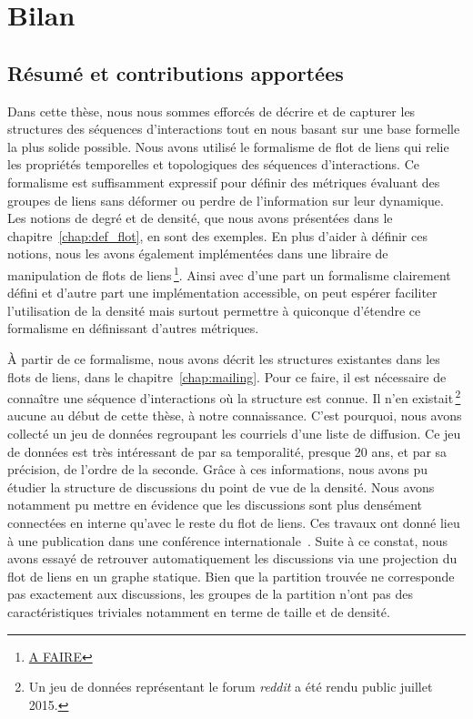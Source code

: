 \chapter*{Bilan}
\label{Conclusion}

\section{Résumé et contributions apportées}

Dans cette thèse, nous nous sommes efforcés de décrire et de capturer les structures des séquences d'interactions tout en nous basant sur une base formelle la plus solide possible.
Nous avons utilisé le formalisme de flot de liens qui relie les propriétés temporelles et topologiques des séquences d'interactions.
Ce formalisme est suffisamment expressif pour définir des métriques évaluant des groupes de liens sans déformer ou perdre de l'information sur leur dynamique.
Les notions de degré et de densité, que nous avons présentées dans le chapitre~\ref{chap:def_flot}, en sont des exemples.
En plus d'aider à définir ces notions, nous les avons également implémentées dans une libraire de manipulation de flots de liens\,\footnote{\url{A FAIRE}}.
Ainsi avec d'une part un formalisme clairement défini et d'autre part une implémentation accessible, on peut espérer faciliter l'utilisation de la densité mais surtout permettre à quiconque d'étendre ce formalisme en définissant d'autres métriques.

\`A partir de ce formalisme, nous avons décrit les structures existantes dans les flots de liens, dans le chapitre~\ref{chap:mailing}.
Pour ce faire, il est nécessaire de connaître une séquence d'interactions où la structure est connue.
Il n'en existait\,\footnote{Un jeu de données représentant le forum \emph{reddit} a été rendu public juillet 2015.} aucune au début de cette thèse, à notre connaissance.
C'est pourquoi, nous avons collecté un jeu de données regroupant les courriels d'une liste de diffusion.
Ce jeu de données est très intéressant de par sa temporalité, presque 20 ans, et par sa précision, de l'ordre de la seconde.
Grâce à ces informations, nous avons pu étudier la structure de discussions du point de vue de la densité.
Nous avons notamment pu mettre en évidence que les discussions sont plus densément connectées en interne qu'avec le reste du flot de liens.
Ces travaux ont donné lieu à une publication dans une conférence internationale~\cite{Gaumont2016}.
Suite à ce constat, nous avons essayé de retrouver automatiquement les discussions via une projection du flot de liens en un graphe statique.
Bien que la partition trouvée ne corresponde pas exactement aux discussions, les groupes de la partition n'ont pas des caractéristiques triviales notamment en terme de taille et de densité.


